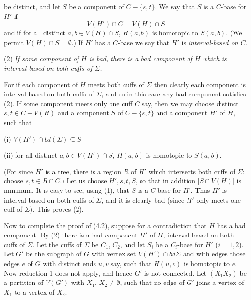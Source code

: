 \noindent be distinct, and let $S$ be a component of $C - \{s, t\}$. We say that $S$ is a $C$-base for $H'$ if
\begin{equation*}
V(H') \cap C = V(H) \cap S
\end{equation*}
and if for all distinct $a, b \in V(H) \cap S$, $H(a, b)$ is homotopic to $S(a, b)$. (We permit $V(H) \cap S = \emptyset$.) If $H'$ has a $C$-base we say that $H'$ is \textit{interval-based on $C$.}

\hspace*{12pt}(2) \textit{If some component of $H$ is bad, there is a bad component of $H$ which is interval-based on both cuffs of $\Sigma$.}

For if each component of $H$ meets both cuffs of $\Sigma$ then clearly each component is interval-based on both cuffs of $\Sigma$, and so in this case any bad component satisfies (2). If some component meets only one cuff $C$ say, then we may choose distinct $s, t \in C - V(H)$ and a component $S$ of $C - \{s, t\}$ and a component $H'$ of $H$, such that

\hspace*{12pt}(i) $V(H') \cap bd(\Sigma) \subseteq S$

\hspace*{12pt}(ii) for all distinct $a, b \in V(H') \cap S$, $H(a, b)$ is homotopic to $S(a, b)$.

(For since $H'$ is a tree, there is a region $R$ of $H'$ which intersects both cuffs of $\Sigma$; choose $s, t \in R \cap C$.) Let us choose $H', s, t, S$, so that in addition $|S \cap V(H)|$ is minimum. It is easy to see, using (1), that $S$ is a $C$-base for $H'$. Thus $H'$ is interval-based on both cuffs of $\Sigma$, and it is clearly bad (since $H'$ only meets one cuff of $\Sigma$). This proves (2).

Now to complete the proof of (4.2), suppose for a contradiction that $H$ has a bad component. By (2) there is a bad component $H'$ of $H$, interval-based on both cuffs of $\Sigma$. Let the cuffs of $\Sigma$ be $C_1$, $C_2$, and let $S_i$ be a $C_i$-base for $H'$ ($i = 1, 2$). Let $G'$ be the subgraph of $G$ with vertex set $V(H') \cap bd\Sigma$ and with edges those edges $e$ of $G$ with distinct ends $u, v$ say, such that $H(u, v)$ is homotopic to $e$. Now reduction 1 does not apply, and hence $G'$ is not connected. Let $(X_1 X_2)$ be a partition of $V(G')$ with $X_1$, $X_2 \ne \emptyset$, such that no edge of $G'$ joins a vertex of $X_1$ to a vertex of $X_2$.

